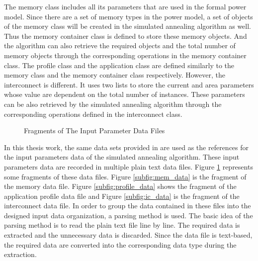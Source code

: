 	The memory class includes all its parameters that are used in the
	formal power model.  Since there are a set of memory types in the
	power model, a set of objects of the memory class will be created in
	the simulated annealing algorithm as well. Thus the memory container
	class is defined to store these memory objects.
	And the algorithm can also retrieve the required objects and the
	total number of memory objects through the corresponding operations
	in the memory container class.
	The profile class and the application class are defined similarly
	to the memory class and the memory container class respectively.
	However, the interconnect is different. It uses two lists to store the
	current and area parameters whose value are dependent on the total
	number of instances. These parameters can be also retrieved by the
	simulated annealing algorithm through the corresponding operations
	defined in the interconnect class.
	\begin{figure}[htb]
		\begin{center}
			\qquad
			\qquad
		\end{center}
		\caption{Fragments of The Input Parameter Data Files \cite{Strobel2016}}
		\label{fig;input_data}
	\end{figure}

	In this thesis work, the same data sets provided in \cite{Strobel2016}
	are used as the references for the input parameters data of the simulated
	annealing algorithm. These input parameters data are recorded in multiple
	plain text data files. Figure \ref{fig;input_data} represents some fragments
	of these data files. Figure \ref{subfig:mem_data} is the fragment of the
	memory data file. Figure \ref{subfig:profile_data} shows the fragment of the
	application profile data file and Figure \ref{subfig:ic_data} is the
	fragment of the interconnect data file. In order to group the data
	contained in these files into the designed input data organization, a
	parsing method is used. The basic idea of the parsing method is to read the
	plain text file line by line. The required data is extracted and the
	unnecessary data is discarded. Since the data file is text-based,
	the required data are converted into the corresponding data type during the
	extraction.

